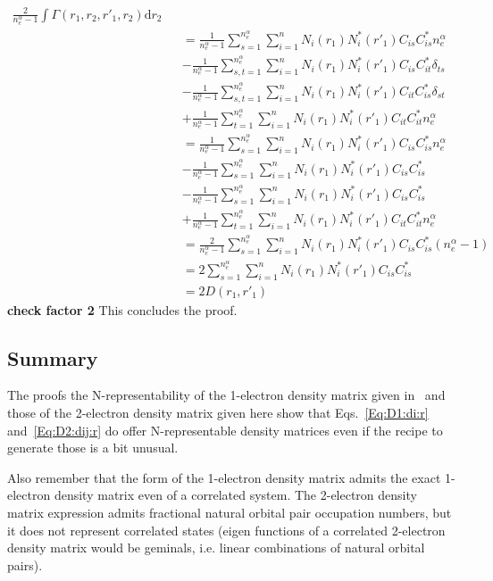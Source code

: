 \documentclass[pra,nofootinbib]{revtex4-1}
\newcommand{\nela}{{n_{e}^\alpha}}
\begin{document}
\begin{eqnarray}
  \frac{2}{\nela-1}\int\Gamma(r_1,r_2,r'_1,r_2)\mathrm{d}r_2 \nonumber \\
  &&= \frac{1}{\nela-1}\sum_{s=1}^{\nela}\sum_{i=1}^{n}
      N_i(r_1) N_i^*(r'_1) C_{is}C_{is}^* \nela \nonumber \\
  &&- \frac{1}{\nela-1}\sum_{s,t=1}^{\nela}\sum_{i=1}^{n}
      N_i(r_1) N_i^*(r'_1) C_{is}C_{it}^* \delta_{ts} \nonumber \\
  &&- \frac{1}{\nela-1}\sum_{s,t=1}^{\nela}\sum_{i=1}^{n}
      N_i(r_1) N_i^*(r'_1) C_{it}C_{is}^* \delta_{st} \nonumber \\
  &&+ \frac{1}{\nela-1}\sum_{t=1}^{\nela}\sum_{i=1}^{n}
      N_i(r_1) N_i^*(r'_1) C_{it}C_{it}^* \nela \\
  &&= \frac{1}{\nela-1}\sum_{s=1}^{\nela}\sum_{i=1}^{n}
      N_i(r_1) N_i^*(r'_1) C_{is}C_{is}^* \nela \nonumber \\
  &&- \frac{1}{\nela-1}\sum_{s=1}^{\nela}\sum_{i=1}^{n}
      N_i(r_1) N_i^*(r'_1) C_{is}C_{is}^*  \nonumber \\
  &&- \frac{1}{\nela-1}\sum_{s=1}^{\nela}\sum_{i=1}^{n}
      N_i(r_1) N_i^*(r'_1) C_{is}C_{is}^*  \nonumber \\
  &&+ \frac{1}{\nela-1}\sum_{t=1}^{\nela}\sum_{i=1}^{n}
      N_i(r_1) N_i^*(r'_1) C_{it}C_{it}^* \nela \\
  &&= \frac{2}{\nela-1}\sum_{s=1}^{\nela}\sum_{i=1}^{n}
      N_i(r_1) N_i^*(r'_1) C_{is}C_{is}^* (\nela-1) \\
  &&= 2\sum_{s=1}^{\nela}\sum_{i=1}^{n}
      N_i(r_1) N_i^*(r'_1) C_{is}C_{is}^* \\
  &&= 2D(r_1,r'_1)
\end{eqnarray}
{\bf check factor 2} 
This concludes the proof.

\subsection{Summary}

The proofs the N-representability of the 1-electron density matrix given
in~\cite{van_Dam_2016} and those of the 2-electron density matrix given here 
show that Eqs.~\ref{Eq:D1:di:r} and~\ref{Eq:D2:dij:r} do offer N-representable
density matrices even if the recipe to generate those is a bit unusual.

Also remember that the form of the 1-electron density matrix admits the exact
1-electron density matrix even of a correlated system. The 2-electron density
matrix expression admits fractional natural orbital pair occupation numbers,
but it does not represent correlated states (eigen functions of a correlated
2-electron density matrix would be geminals, i.e. linear combinations of natural
orbital pairs). 
\end{document}
